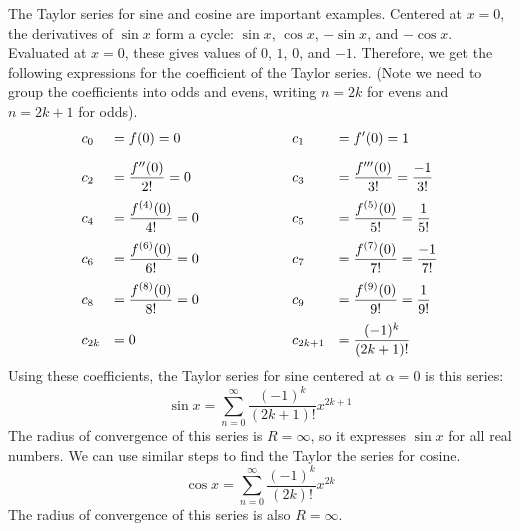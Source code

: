 \documentclass[fleqn,letterpaper]{report}
\begin{document}
\begin{example}
The Taylor series for sine and cosine are important
examples. Centered at $x=0$, the derivatives of $\sin x$ form a
cycle: $\sin x$, $\cos x$, $-\sin x$, and $-\cos x$.
Evaluated at $x=0$, these gives values of $0$, $1$, $0$, and
$-1$. Therefore, we get the following expressions for the
coefficient of the Taylor series. (Note we need to group the
coefficients into odds and evens, writing $n= 2k$ for evens
and $n = 2k+1$ for odds).
\begin{displaymath}
\begin{array}{*4{>{\displaystyle}l}}
c_0 & = f(0) = 0 & 
\hspace{2cm} c_1 & = f^\prime(0) = 1 \\[1em]
c_2 & = \frac{f^{\prime\prime}(0)}{2!} = 0 & 
\hspace{2cm} c_3 & = \frac{f^{\prime\prime\prime}(0)}{3!} =
\frac{-1}{3!} \\[1em]
c_4 & = \frac{f^{(4)}(0)}{4!} = 0 & 
\hspace{2cm} c_5 & = \frac{f^{(5)}(0)}{5!} = \frac{1}{5!}
\\[1em]
c_6 & = \frac{f^{(6)}(0)}{6!} = 0 & 
\hspace{2cm} c_7 & = \frac{f^{(7)}(0)}{7!} = \frac{-1}{7!}
\\[1em]
c_8 & = \frac{f^{(8)}(0)}{8!} = 0 & 
\hspace{2cm} c_9 & = \frac{f^{(9)}(0)}{9!} = \frac{1}{9!}
\\[1em]
c_{2k} & = 0 & 
\hspace{2cm} c_{2k+1} & = \frac{(-1)^k}{(2k+1)!}
\end{array}
\end{displaymath}
Using these coefficients, the Taylor series for sine centered
at $\alpha = 0$ is this series:
\begin{equation*}
\sin x = \sum_{n=0}^\infty \frac{(-1)^k}{(2k+1)!} x^{2k+1}
\end{equation*}
The radius of convergence of this series is $R = \infty$, so
it expresses $\sin x$ for all real numbers. We can use similar
steps to find the Taylor the series for cosine.
\begin{equation*}
\cos x = \sum_{n=0}^\infty \frac{(-1)^k}{(2k)!} x^{2k}
\end{equation*}
The radius of convergence of this series is also $R = \infty$. 
\end{example}
\end{document}
